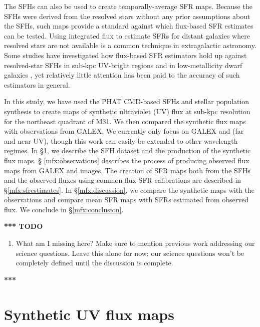 The \citet{Lewis:2014} SFHs can also be used to create temporally-average SFR
maps. Because the SFHs were derived from the resolved stars without any prior
assumptions about the SFHs, such maps provide a standard against which
flux-based SFR estimates \citep[e.g., using any of the calibrations
from][]{Kennicutt:2012} can be tested. Using integrated flux to estimate SFRs
for distant galaxies where resolved stars are not available is a common
technique in extragalactic astronomy. Some studies have investigated how
flux-based SFR estimators hold up against resolved-star SFHs in sub-kpc
UV-bright regions \citep{Simones:2014} and in low-metallicity dwarf galaxies
\citep{McQuinn:2014}, yet relatively little attention has been paid to the
accuracy of such estimators in general.

In this study, we have used the PHAT CMD-based SFHs and stellar population
synthesis to create maps of synthetic ultraviolet (UV) flux at sub-kpc
resolution for the northeast quadrant of M31. We then compared the synthetic
flux maps with observations from GALEX. We currently only focus on GALEX \fuv{}
and \nuv{} (far and near UV), though this work can easily be extended to other
wavelength regimes. In \S \ref{mfx:syntheticfluxmaps}, we describe the SFH
dataset and the production of the synthetic flux maps. \S
\ref{mfx:observations} describes the process of producing observed flux maps
from GALEX \fuv{} and \nuv{} images. The creation of SFR maps both from the
SFHs and the observed fluxes using common flux-SFR calibrations are described
in \S \ref{mfx:sfrestimates}. In \S \ref{mfx:discussion}, we compare the
synthetic maps with the observations and compare mean SFR maps with SFRs
estimated from observed flux. We conclude in \S \ref{mfx:conclusion}.

\textbf{*** TODO}

\begin{enumerate}
\item What am I missing here? Make sure to mention previous work addressing our
    science questions. Leave this alone for now; our science questions won't be
    completely defined until the discussion is complete.
\end{enumerate}

\textbf{***}





\section{Synthetic UV flux maps}\label{mfx:syntheticfluxmaps}



